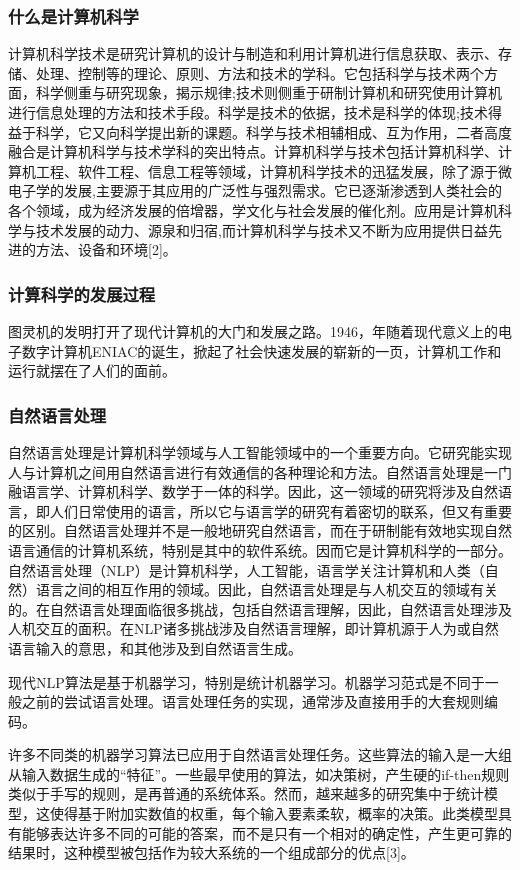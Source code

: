 \documentclass{article}
\begin{document}
\subsubsection{什么是计算机科学}
计算机科学技术是研究计算机的设计与制造和利用计算机进行信息获取、表示、存储、处理、控制等的理论、原则、方法和技术的学科。它包括科学与技术两个方面，科学侧重与研究现象，揭示规律;技术则侧重于研制计算机和研究使用计算机进行信息处理的方法和技术手段。科学是技术的依据，技术是科学的体现;技术得益于科学，它又向科学提出新的课题。科学与技术相辅相成、互为作用，二者高度融合是计算机科学与技术学科的突出特点。计算机科学与技术包括计算机科学、计算机工程、软件工程、信息工程等领域，计算机科学技术的迅猛发展，除了源于微电子学的发展,主要源于其应用的广泛性与强烈需求。它已逐渐渗透到人类社会的各个领域，成为经济发展的倍增器，学文化与社会发展的催化剂。应用是计算机科学与技术发展的动力、源泉和归宿,而计算机科学与技术又不断为应用提供日益先进的方法、设备和环境[2]。

\subsubsection{计算科学的发展过程}
图灵机的发明打开了现代计算机的大门和发展之路。1946，年随着现代意义上的电子数字计算机ENIAC的诞生，掀起了社会快速发展的崭新的一页，计算机工作和运行就摆在了人们的面前。

\subsubsection{自然语言处理}
自然语言处理是计算机科学领域与人工智能领域中的一个重要方向。它研究能实现人与计算机之间用自然语言进行有效通信的各种理论和方法。自然语言处理是一门融语言学、计算机科学、数学于一体的科学。因此，这一领域的研究将涉及自然语言，即人们日常使用的语言，所以它与语言学的研究有着密切的联系，但又有重要的区别。自然语言处理并不是一般地研究自然语言，而在于研制能有效地实现自然语言通信的计算机系统，特别是其中的软件系统。因而它是计算机科学的一部分。自然语言处理（NLP）是计算机科学，人工智能，语言学关注计算机和人类（自然）语言之间的相互作用的领域。因此，自然语言处理是与人机交互的领域有关的。在自然语言处理面临很多挑战，包括自然语言理解，因此，自然语言处理涉及人机交互的面积。在NLP诸多挑战涉及自然语言理解，即计算机源于人为或自然语言输入的意思，和其他涉及到自然语言生成。

现代NLP算法是基于机器学习，特别是统计机器学习。机器学习范式是不同于一般之前的尝试语言处理。语言处理任务的实现，通常涉及直接用手的大套规则编码。

许多不同类的机器学习算法已应用于自然语言处理任务。这些算法的输入是一大组从输入数据生成的“特征”。一些最早使用的算法，如决策树，产生硬的if-then规则类似于手写的规则，是再普通的系统体系。然而，越来越多的研究集中于统计模型，这使得基于附加实数值的权重，每个输入要素柔软，概率的决策。此类模型具有能够表达许多不同的可能的答案，而不是只有一个相对的确定性，产生更可靠的结果时，这种模型被包括作为较大系统的一个组成部分的优点[3]。
\end{document}
